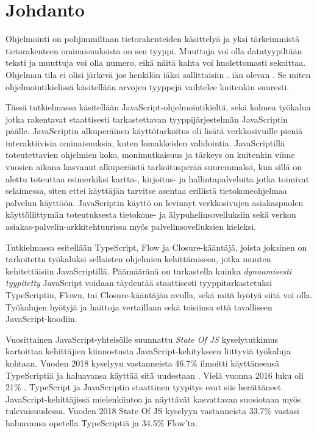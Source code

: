 \chapter{Johdanto} \label{Johdanto}

Ohjelmointi on pohjimmiltaan tietorakenteiden käsittelyä ja yksi tärkeimmistä
tietorakenteen ominaisuuksista on sen tyyppi. Muuttuja  voi olla
datatyypiltään teksti ja muuttuja  voi olla numero, eikä näitä kahta voi
huolettomasti sekoittaa. Ohjelman tila ei olisi järkevä jos henkilön
iäksi sallittaisiin .
iän olevan . Se miten ohjelmointikielissä käsitellään arvojen tyyppejä
vaihtelee kuitenkin suuresti.

Tässä tutkielmassa käsitellään JavaScript-ohjelmointikieltä,
sekä kolmea työkalua\newline
jotka rakentavat staattisesti tarkastettavan tyyppijärjestelmän
JavaScriptin päälle.\newline
JavaScriptin alkuperäinen käyttötarkoitus
oli lisätä verkkosivuille pieniä interaktiivisia ominaisuuksia,
kuten lomakkeiden validointia. JavaScriptillä
toteutettavien ohjelmien koko, monimutkaisuus ja tärkeys on kuitenkin viime
vuosien aikana kasvanut alkuperäistä tarkoitusperää suuremmaksi, kun sillä on
alettu toteuttaa esimerkiksi kartta-, kirjoitus- ja hallintapalveluita jotka
toimivat selaimessa, siten ettei käyttäjän tarvitse asentaa erillistä
tietokoneohjelmaa palvelun käyttöön.
JavaScriptin käyttö on levinnyt verkkosivujen asiakaspuolen käyttöliittymän
toteutuksesta tietokone- ja älypuhelinsovelluksiin sekä verkon
asiakas-palvelin-arkkitehtuurissa myös palvelinsovelluksien kieleksi.

Tutkielmassa esitellään TypeScript, Flow ja Closure-kääntäjä, joista jokainen on
tarkoitettu työkaluksi sellaisten ohjelmien kehittämiseen,
jotka muuten kehitettäisiin\newline
JavaScriptillä. Päämääränä on tarkastella kuinka \textit{dynaamisesti tyypitetty}
JavaScript voidaan täydentää staattisesti tyyppitarkastetuksi
TypeScriptin, Flown, tai Closure-kääntäjän avulla, sekä mitä hyötyä siitä voi
olla. Työkalujen hyötyjä ja haittoja vertaillaan sekä toisiinsa että
tavalliseen JavaScript-koodiin.

Vuosittainen JavaScript-yhteisölle
suunnattu \textit{State Of JS} kyselytutkimus kartoittaa kehittäjien
kiinnostusta JavaScript-kehitykseen liittyviä työkaluja kohtaan.
Vuoden 2018 kyselyyn vastanneista 46.7\% ilmoitti
käyttäneensä TypeScriptiä ja haluavansa
käyttää sitä uudestaan \cite{StateOfJs2018}.
Vielä vuonna 2016 luku oli 21\% \cite{StateOfJs2016}. TypeScript ja
JavaScriptin staattinen tyypitys ovat siis herättäneet
JavaScript-kehittäjissä mielenkiintoa ja näyttävät kasvattavan
suosiotaan myös tulevaisuudessa.
Vuoden 2018 State Of JS kyselyyn vastanneista 33.7\% vastasi haluavansa
opetella TypeScriptiä ja 34.5\% Flow'ta.